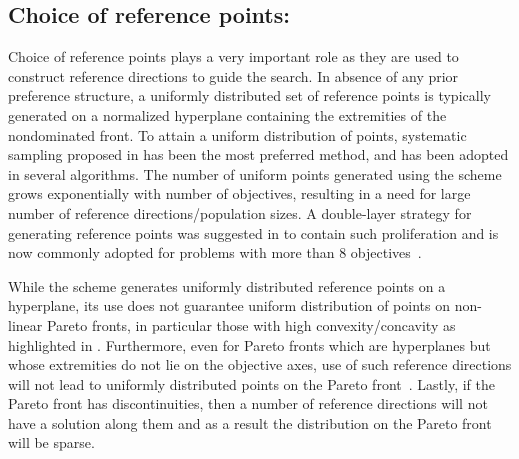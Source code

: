 \subsection{Choice of reference points:} Choice of reference points plays a very important role as they are used to construct reference directions to guide the search. In absence of any prior preference structure, a uniformly distributed set of reference points is typically generated on a normalized hyperplane containing the extremities of the nondominated front. To attain a uniform distribution of points, systematic sampling proposed in \cite{das1998normal} has been the most preferred method, and has been adopted in several algorithms\cite{Asafmany2015,Deb2014box,Li2015dominance,Yuan2016many,Cheng2016many}. The number of uniform points generated using the scheme grows exponentially with number of objectives, resulting in a need for large number of reference directions/population sizes. A double-layer strategy for generating reference points was suggested in \cite{Deb2014box} to contain such proliferation and is now commonly adopted for problems with more than 8 objectives~\cite{Li2015dominance, Yuan2016many}.

While the scheme generates uniformly distributed reference points on a hyperplane, its use does not guarantee uniform distribution of points on non-linear Pareto fronts, in particular those with high convexity/concavity as highlighted in \cite{asaf2015char,Qi2014adaptive}. Furthermore, even for Pareto fronts which are hyperplanes but whose extremities do not lie on the objective axes, use of such reference directions will not lead to uniformly distributed points on the Pareto front~\cite{ishibuchi2016performance}. Lastly, if the Pareto front has discontinuities, then a number of reference directions will not have a solution along them and as a result the distribution on the Pareto front will be sparse. 


